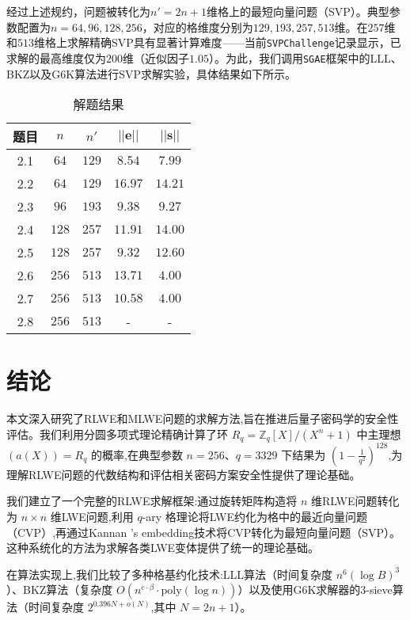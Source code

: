 \documentclass[12pt,a4paper]{article}
\numberwithin{equation}{section}
\begin{document}
经过上述规约，问题被转化为$n'=2n+1$维格上的最短向量问题（SVP）。典型参数配置为$n=64,96,128,256$，对应的格维度分别为$129,193,257,513$维。在$257$维和$513$维格上求解精确SVP具有显著计算难度——当前\texttt{SVPChallenge}记录显示，已求解的最高维度仅为$200$维（近似因子$1.05$）。为此，我们调用\texttt{SGAE}框架中的LLL、BKZ以及G6K算法进行SVP求解实验，具体结果如下所示。

\begin{table}[htbp]
  \centering
  \caption{解题结果}
  \label{tab:svp-performance}
  \begin{tabular}{|c|c|c|c|c|}
    \hline
    题目 & $n$ &$n'$&$||\mathbf{e}||$ & $||\mathbf{s}||$ \\
    \hline
    2.1 &$64$ & $129$& $8.54$ & $7.99$ \\
    2.2 &$64$ & $129$& $16.97$ & $14.21$ \\
    2.3 &$96$ & $193$& $9.38$ & $9.27$ \\
    2.4 &$128$& $257$& $11.91$ & $14.00$ \\
    2.5 &$128$& $257$& $9.32$ & $12.60$ \\
    2.6 &$256$& $513$& $13.71$ & $4.00$ \\
    2.7 &$256$& $513$& $10.58$ & $4.00$ \\
    2.8 &$256$& $513$& - & - \\
    \hline
  \end{tabular}
\end{table}

\section{结论}

本文深入研究了RLWE和MLWE问题的求解方法,旨在推进后量子密码学的安全性评估。我们利用分圆多项式理论精确计算了环 $R_q = \mathbb{Z}_q[X]/(X^n + 1)$ 中主理想 $(a(X)) = R_q$ 的概率,在典型参数 $n = 256$、$q = 3329$ 下结果为 $(1-\frac{1}{q^2})^{128}$,为理解RLWE问题的代数结构和评估相关密码方案安全性提供了理论基础。

我们建立了一个完整的RLWE求解框架:通过旋转矩阵构造将 $n$ 维RLWE问题转化为 $n \times n$ 维LWE问题,利用 $q$-ary 格理论将LWE约化为格中的最近向量问题（CVP）,再通过Kannan 's embedding技术将CVP转化为最短向量问题（SVP）。这种系统化的方法为求解各类LWE变体提供了统一的理论基础。

在算法实现上,我们比较了多种格基约化技术:LLL算法（时间复杂度 $n^6 (\log B)^3$）、BKZ算法（复杂度 $O(n^{c \cdot \beta} \cdot \text{poly}(\log n))$）以及使用G6K求解器的3-sieve算法（时间复杂度 $2^{0.396N+o(N)}$,其中 $N=2n+1$）。
\end{document}
